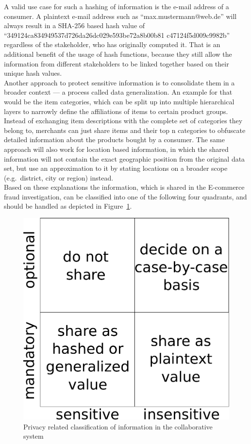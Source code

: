A valid use case for such a hashing of information is the e-mail address of a consumer. A plaintext e-mail address such as ``max.mustermann@web.de'' will always result in a \gls{SHA-2}56 based hash value of ``349124ca834949537d726da26dc029e593be72a8b00b81 c47124f5d009c9982b'' regardless of the stakeholder, who has originally computed it. That is an additional benefit of the usage of hash functions, because they still allow the information from different stakeholders to be linked together based on their unique hash values. \\

Another approach to protect sensitive information is to consolidate them in a broader context --- a process called data generalization. An example for that would be the item categories, which can be split up into multiple hierarchical layers to narrowly define the affiliations of items to certain product groups. Instead of exchanging item descriptions with the complete set of categories they belong to, merchants can just share items and their top n categories to obfuscate detailed information about the products bought by a consumer. The same approach will also work for location based information, in which the shared information will not contain the exact geographic position from the original data set, but use an approximation to it by stating locations on a broader scope (e.g.\ district, city or region) instead. \\

Based on these explanations the information, which is shared in the \gls{E-commerce} fraud investigation, can be classified into one of the following four quadrants, and should be handled as depicted in Figure~\ref{fig:images_handle_privacy_concerns}. \@

\begin{figure}[H]
	\centering
		\includegraphics[width=0.5\columnwidth]{images/privacy_concerns.pdf}
	\caption{Privacy related classification of information in the collaborative system}
\label{fig:images_handle_privacy_concerns}
\end{figure}


